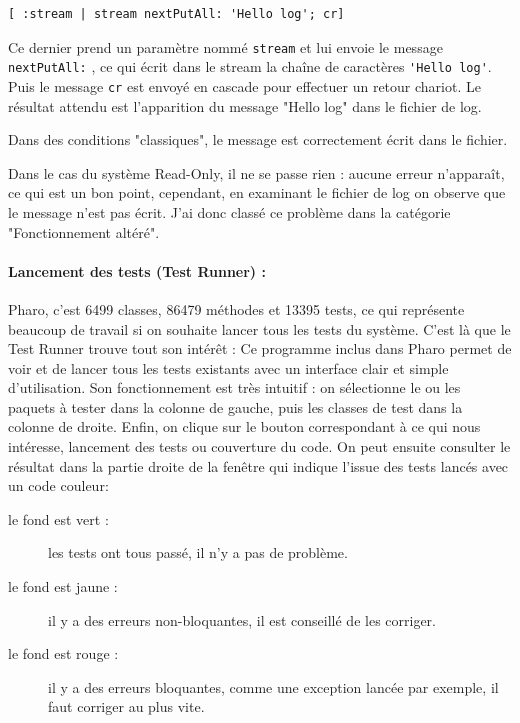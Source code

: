 \begin{verbatim}
[ :stream | stream nextPutAll: 'Hello log'; cr]
\end{verbatim}

Ce dernier prend un paramètre nommé \verb$stream$ et lui envoie le message \verb$nextPutAll:$ , ce qui écrit dans le stream la chaîne de caractères \verb$'Hello log'$. Puis le message \verb$cr$ est envoyé en cascade pour effectuer un retour chariot. Le résultat attendu est l'apparition du message "Hello log" dans le fichier de log.

Dans des conditions "classiques", le message est correctement écrit dans le fichier.

Dans le cas du système Read-Only, il ne se passe rien : aucune erreur n'apparaît, ce qui est un bon point, cependant, en examinant le fichier de log on observe que le message n'est pas écrit. J'ai donc classé ce problème dans la catégorie "Fonctionnement altéré".

\paragraph{Lancement des tests (Test Runner) :}
Pharo, c'est 6499 classes, 86479 méthodes et 13395 tests, ce qui représente beaucoup de travail si on souhaite lancer tous les tests du système. C'est là que le Test Runner trouve tout son intérêt : Ce programme inclus dans Pharo permet de voir et de lancer tous les tests existants avec un interface clair et simple d'utilisation. Son fonctionnement est très intuitif : on sélectionne le ou les paquets à tester dans la colonne de gauche, puis les classes de test dans la colonne de droite. Enfin, on clique sur le bouton correspondant à ce qui nous intéresse, lancement des tests ou couverture du code. On peut ensuite consulter le résultat dans la partie droite de la fenêtre qui indique l'issue des tests lancés avec un code couleur:

\begin{description}
	\item[le fond est vert :] les tests ont tous passé, il n'y a pas de problème.
	\item[le fond est jaune :] il y a des erreurs non-bloquantes, il est conseillé de les corriger.
	\item[le fond est rouge :] il y a des erreurs bloquantes, comme une exception lancée par exemple, il faut corriger au plus vite.
\end{description}

